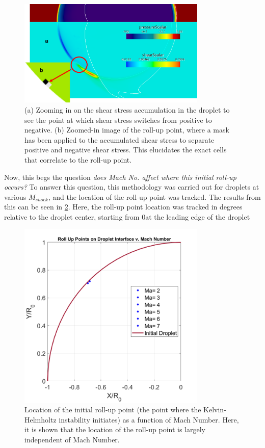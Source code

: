 \documentclass{UCF_ETD}
\begin{document}
\begin{figure}
    \centering
    \includegraphics[width=0.8\textwidth]{Figures/roll_up_points.png}
    \caption{(a) Zooming in on the shear stress accumulation in the droplet to see the point at which shear stress switches from positive to negative. (b) Zoomed-in image of the roll-up point, where a mask has been applied to the accumulated shear stress to separate positive and negative shear stress. This elucidates the exact cells that correlate to the roll-up point.}
    \label{fig:roll_up_points}
\end{figure}

Now, this begs the question \textit{does Mach No. affect where this initial roll-up occurs?} To answer this question, this methodology was carried out for droplets at various $M_{shock}$, and the location of the roll-up point was tracked. The results from this can be seen in \ref{fig:roll_up_points_data}.
Here, the roll-up point location was tracked in degrees relative to the droplet center, starting from 0\degree at the leading edge of the droplet

\begin{figure}
    \centering
    \includegraphics[width=0.8\textwidth]{Figures/roll_up_Mach.png}
    \caption{Location of the initial roll-up point (the point where the Kelvin-Helmholtz instability initiates) as a function of Mach Number. Here, it is shown that the location of the roll-up point is largely independent of Mach Number.}
    \label{fig:roll_up_points_data}
\end{figure}
\end{document}
